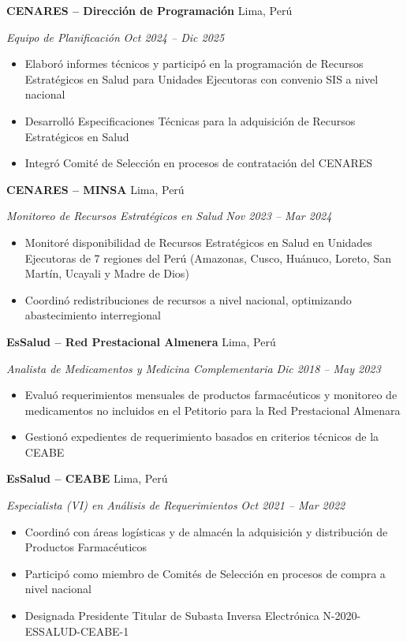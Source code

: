 \documentclass[10.5pt,letterpaper]{article}
\newcommand{\entry}[4]{%
  \noindent\textbf{#1} \hfill #2 \par\nopagebreak
  \textit{#3} \hfill \textit{#4} \par\nopagebreak
}
\begin{document}
\entry{CENARES -- Direcci\'on de Programaci\'on}{Lima, Per\'u}{Equipo de Planificaci\'on}{Oct 2024 -- Dic 2025}
\begin{itemize}
  \item Elabor\'o informes t\'ecnicos y particip\'o en la programaci\'on de Recursos Estrat\'egicos en Salud para Unidades Ejecutoras con convenio SIS a nivel nacional
  \item Desarroll\'o Especificaciones T\'ecnicas para la adquisici\'on de Recursos Estrat\'egicos en Salud
  \item Integr\'o Comit\'e de Selecci\'on en procesos de contrataci\'on del CENARES
\end{itemize}
\vspace{0.3em}

\entry{CENARES -- MINSA}{Lima, Per\'u}{Monitoreo de Recursos Estrat\'egicos en Salud}{Nov 2023 -- Mar 2024}
\begin{itemize}
  \item Monitor\'e disponibilidad de Recursos Estrat\'egicos en Salud en Unidades Ejecutoras de 7 regiones del Per\'u (Amazonas, Cusco, Hu\'anuco, Loreto, San Mart\'in, Ucayali y Madre de Dios)
  \item Coordin\'o redistribuciones de recursos a nivel nacional, optimizando abastecimiento interregional
\end{itemize}
\vspace{0.3em}

\entry{EsSalud -- Red Prestacional Almenera}{Lima, Per\'u}{Analista de Medicamentos y Medicina Complementaria}{Dic 2018 -- May 2023}
\begin{itemize}
  \item Evalu\'o requerimientos mensuales de productos farmac\'euticos y monitoreo de medicamentos no incluidos en el Petitorio para la Red Prestacional Almenara
  \item Gestion\'o expedientes de requerimiento basados en criterios t\'ecnicos de la CEABE
\end{itemize}
\vspace{0.3em}

\entry{EsSalud -- CEABE}{Lima, Per\'u}{Especialista (VI) en An\'alisis de Requerimientos}{Oct 2021 -- Mar 2022}
\begin{itemize}
  \item Coordin\'o con \'areas log\'isticas y de almac\'en la adquisici\'on y distribuci\'on de Productos Farmac\'euticos
  \item Particip\'o como miembro de Comit\'es de Selecci\'on en procesos de compra a nivel nacional
  \item Designada Presidente Titular de Subasta Inversa Electr\'onica N-2020-ESSALUD-CEABE-1
\end{itemize}
\vspace{0.3em}
\end{document}
